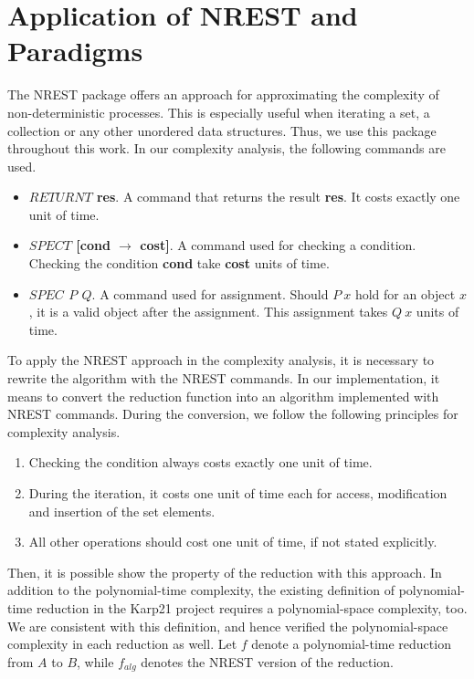 \section{Application of NREST and Paradigms}
The NREST \cite{haslbeck2021verified} package offers an approach for approximating the complexity of non-deterministic processes.
This is especially useful when iterating a set, a collection or any other unordered data structures. Thus,
we use this package throughout this work. In our complexity analysis, the following commands are used. 
\begin{itemize}
    \item \textbf{$RETURNT$ res}. A command that returns the result \textbf{res}. It costs exactly one unit of time.
    \item \textbf{$SPECT$ [cond $\rightarrow$ cost]}. A command used for checking a condition. Checking the condition \textbf{cond}
    take \textbf{cost} units of time.
    \item \textbf{$SPEC$ $P$ $Q$}. A command used for assignment. 
    Should $P\ x$ hold for an object $x$, it is a valid object after the assignment.
    This assignment takes $Q\ x$ units of time.
\end{itemize}
To apply the NREST approach in the complexity analysis, it is necessary to rewrite the algorithm with the NREST commands.
In our implementation, it means to convert the reduction function into an algorithm implemented with NREST commands.
During the conversion, we follow the following principles for complexity analysis.
\begin{enumerate}
    \label{para1}
    \item Checking the condition always costs exactly one unit of time. 
    \item During the iteration, it costs one unit of time each for access, modification and insertion of the set elements.
    \item All other operations should cost one unit of time, if not stated explicitly.
\end{enumerate}
Then, it is possible show the property of the reduction with this approach. In addition to the polynomial-time complexity, 
the existing definition of polynomial-time reduction in the Karp21 project requires a polynomial-space complexity, too. 
We are consistent with this definition, and hence verified the polynomial-space complexity in each reduction as well.
Let $f$ denote a polynomial-time reduction from $A$ to $B$, while $f_{alg}$ denotes the NREST version of the reduction.
